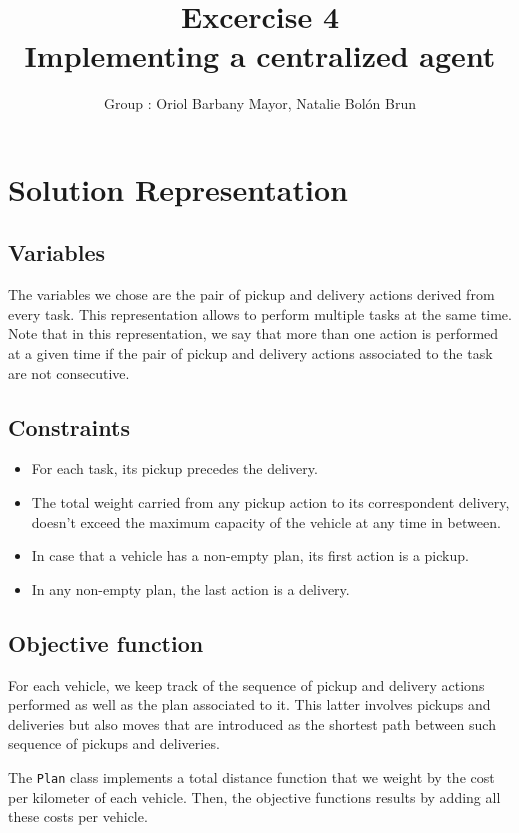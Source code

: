\documentclass[11pt]{article}
\title{\bf Excercise 4\\ Implementing a centralized agent}
\author{Group \textnumero 54: Oriol Barbany Mayor, Natalie Bolón Brun}
\begin{document}
\maketitle

\section{Solution Representation}
\subsection{Variables}
The variables we chose are the pair of pickup and delivery actions derived from every task. This representation allows to perform multiple tasks at the same time. Note that in this representation, we say that more than one action is performed at a given time if the pair of pickup and delivery actions associated to the task are not consecutive.

\subsection{Constraints}
\begin{itemize}
    \item For each task, its pickup precedes the delivery.
    \item The total weight carried from any pickup action to its correspondent delivery, doesn't exceed the maximum capacity of the vehicle at any time in between.
    \item In case that a vehicle has a non-empty plan, its first action is a pickup.
    \item In any non-empty plan, the last action is a delivery.
\end{itemize}

\subsection{Objective function}
For each vehicle, we keep track of the sequence of pickup and delivery actions performed as well as the plan associated to it. This latter involves pickups and deliveries but also moves that are introduced as the shortest path between such sequence of pickups and deliveries.

The \texttt{Plan} class implements a total distance function that we weight by the cost per kilometer of each vehicle. Then, the objective functions results by adding all these costs per vehicle.
\end{document}
